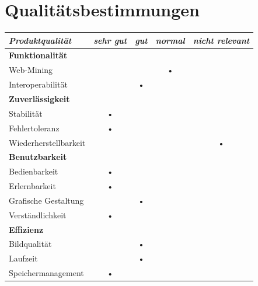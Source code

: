\documentclass[10pt]{scrreprt}
\begin{document}
\chapter{Qualitätsbestimmungen}


\vspace{1cm}
\begin{center}
\begin{tabular}{lcccc}
\hline 
\rule[-1ex]{0pt}{4ex} \textit{Produktqualität} & \textit{sehr gut} & \textit{gut} & \textit{normal} & \textit{nicht relevant} \\ 
\hline 
\rule[-1ex]{0pt}{4ex} \textbf{Funktionalität} &  &  &  &  \\ 
\rule[-1ex]{0pt}{4ex} \hspace{10pt} Web-Mining & &  & • & \\ 
\rule[-1ex]{0pt}{4ex} \hspace{10pt} Interoperabilität & & • & & \\ 

\hline 
\rule[-1ex]{0pt}{4ex} \textbf{Zuverlässigkeit} &  &  &  &  \\ 
\rule[-1ex]{0pt}{4ex} \hspace{10pt} Stabilität & • & & & \\ 
\rule[-1ex]{0pt}{4ex} \hspace{10pt} Fehlertoleranz & • & & & \\ 
\rule[-1ex]{0pt}{4ex} \hspace{10pt} Wiederherstellbarkeit &  &  &  & • \\ 

\hline 
\rule[-1ex]{0pt}{4ex} \textbf{Benutzbarkeit} &  &  &  &  \\ 
\rule[-1ex]{0pt}{4ex} \hspace{10pt} Bedienbarkeit & • & & & \\ 
\rule[-1ex]{0pt}{4ex} \hspace{10pt} Erlernbarkeit & • & & & \\ 
\rule[-1ex]{0pt}{4ex} \hspace{10pt} Grafische Gestaltung & & • & & \\ 
\rule[-1ex]{0pt}{4ex} \hspace{10pt} Verständlichkeit & • & & & \\ 

\hline 
\rule[-1ex]{0pt}{4ex} \textbf{Effizienz} &  &  &  &  \\ 
\rule[-1ex]{0pt}{4ex} \hspace{10pt} Bildqualität & & • & & \\ 
\rule[-1ex]{0pt}{4ex} \hspace{10pt} Laufzeit & & • & & \\ 
\rule[-1ex]{0pt}{4ex} \hspace{10pt} Speichermanagement & • & & & \\ 


\end{tabular}
\end{center}
\end{document}
